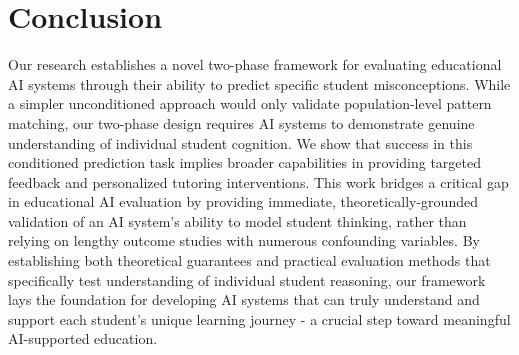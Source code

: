 \section{Conclusion}

Our research establishes a novel two-phase framework for evaluating educational AI systems through their ability to predict specific student misconceptions. While a simpler unconditioned approach would only validate population-level pattern matching, our two-phase design requires AI systems to demonstrate genuine understanding of individual student cognition. We show that success in this conditioned prediction task implies broader capabilities in providing targeted feedback and personalized tutoring interventions. This work bridges a critical gap in educational AI evaluation by providing immediate, theoretically-grounded validation of an AI system's ability to model student thinking, rather than relying on lengthy outcome studies with numerous confounding variables. By establishing both theoretical guarantees and practical evaluation methods that specifically test understanding of individual student reasoning, our framework lays the foundation for developing AI systems that can truly understand and support each student's unique learning journey - a crucial step toward meaningful AI-supported education.